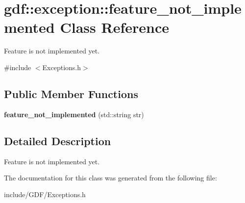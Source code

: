 \hypertarget{classgdf_1_1exception_1_1feature__not__implemented}{
\section{gdf::exception::feature\_\-not\_\-implemented Class Reference}
\label{classgdf_1_1exception_1_1feature__not__implemented}
}


Feature is not implemented yet.  




{\ttfamily \#include $<$Exceptions.h$>$}

\subsection*{Public Member Functions}
\begin{DoxyCompactItemize}
\item 
\hypertarget{classgdf_1_1exception_1_1feature__not__implemented_a0aaf9b8ec42a38423d1d6a3ec682e766}{
{\bfseries feature\_\-not\_\-implemented} (std::string str)}
\label{classgdf_1_1exception_1_1feature__not__implemented_a0aaf9b8ec42a38423d1d6a3ec682e766}

\end{DoxyCompactItemize}


\subsection{Detailed Description}
Feature is not implemented yet. 

The documentation for this class was generated from the following file:\begin{DoxyCompactItemize}
\item 
include/GDF/Exceptions.h\end{DoxyCompactItemize}

